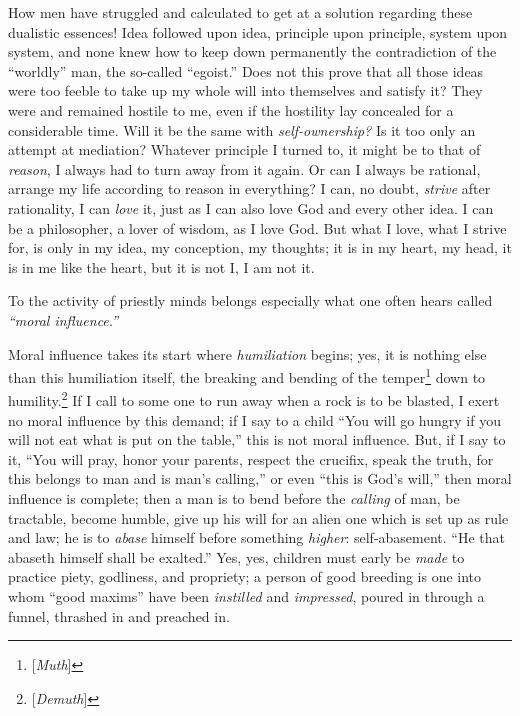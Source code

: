 How men have struggled and calculated to get at a solution regarding these 
dualistic essences! Idea followed upon idea, principle upon principle, system 
upon system, and none knew how to keep down permanently the contradiction of 
the ``worldly'' man, the so-called ``egoist.'' Does not this prove that 
all those ideas were too feeble to take up my whole will into themselves and 
satisfy it? They were and remained hostile to me, even if the hostility lay 
concealed for a considerable time. Will it be the same with 
\textit{self-ownership?} Is it too only an attempt at mediation? Whatever 
principle I turned to, it might be to that of \textit{reason}, I always had to 
turn away from it again. Or can I always be rational, arrange my life 
according to reason in everything? I can, no doubt, \textit{strive} after 
rationality, I can \textit{love} it, just as I can also love God and every 
other idea. I can be a philosopher, a lover of wisdom, as I love God. But what 
I love, what I strive for, is only in my idea, my conception, my thoughts; it 
is in my heart, my head, it is in me like the heart, but it is not I, I am not 
it.

To the activity of priestly minds belongs especially what one often hears 
called \textit{``moral influence.''}

Moral influence takes its start where \textit{humiliation} begins; yes, it is 
nothing else than this humiliation itself, the breaking and bending of the 
temper\footnote{[\textit{Muth}]} down to humility.\footnote{[\textit{Demuth}]} 
If I call to some one to run away when a rock is to be blasted, I exert no 
moral influence by this demand; if I say to a child ``You will go hungry if 
you will not eat what is put on the table,'' this is not moral influence. 
But, if I say to it, ``You will pray, honor your parents, respect the 
crucifix, speak the truth, for this belongs to man and is man's calling,'' or 
even ``this is God's will,'' then moral influence is complete; then a man is 
to bend before the \textit{calling} of man, be tractable, become humble, give 
up his will for an alien one which is set up as rule and law; he is to 
\textit{abase} himself before something \textit{higher}: self-abasement. ``He 
that abaseth himself shall be exalted.'' Yes, yes, children must early be 
\textit{made} to practice piety, godliness, and propriety; a person of good 
breeding is one into whom ``good maxims'' have been \textit{instilled} and 
\textit{impressed}, poured in through a funnel, thrashed in and preached in.

